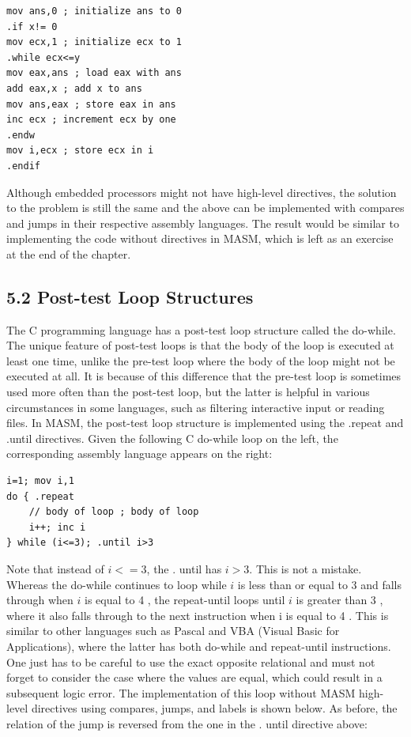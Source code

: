 \documentclass[10pt]{article}
\begin{document}
\begin{verbatim}
mov ans,0 ; initialize ans to 0
.if x!= 0
mov ecx,1 ; initialize ecx to 1
.while ecx<=y
mov eax,ans ; load eax with ans
add eax,x ; add x to ans
mov ans,eax ; store eax in ans
inc ecx ; increment ecx by one
.endw
mov i,ecx ; store ecx in i
.endif
\end{verbatim}

Although embedded processors might not have high-level directives, the solution to the problem is still the same and the above can be implemented with compares and jumps in their respective assembly languages. The result would be similar to implementing the code without directives in MASM, which is left as an exercise at the end of the chapter.

\subsection*{5.2 Post-test Loop Structures}
The C programming language has a post-test loop structure called the do-while. The unique feature of post-test loops is that the body of the loop is executed at least one time, unlike the pre-test loop where the body of the loop might not be executed at all. It is because of this difference that the pre-test loop is sometimes used more often than the post-test loop, but the latter is helpful in various circumstances in some languages, such as filtering interactive input or reading files. In MASM, the post-test loop structure is implemented using the .repeat and .until directives. Given the following C do-while loop on the left, the corresponding assembly language appears on the right:

\begin{verbatim}
i=1; mov i,1
do { .repeat
    // body of loop ; body of loop
    i++; inc i
} while (i<=3); .until i>3
\end{verbatim}

Note that instead of $i<=3$, the . until has $i>3$. This is not a mistake. Whereas the do-while continues to loop while $i$ is less than or equal to 3 and falls through when $i$ is equal to 4 , the repeat-until loops until $i$ is greater than 3 , where it also falls through to the next instruction when i is equal to 4 . This is similar to other languages such as Pascal and VBA (Visual Basic for Applications), where the latter has both do-while and repeat-until instructions. One just has to be careful to use the exact opposite relational and must not forget to consider the case where the values are equal, which could result in a subsequent logic error. The implementation of this loop without MASM high-level directives using compares, jumps, and labels is shown below. As before, the relation of the jump is reversed from the one in the . until directive above:
\end{document}
